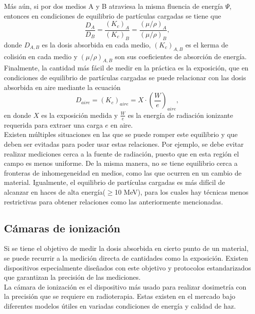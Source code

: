Más aún, si por dos medios A y B atraviesa la misma fluencia de energía $\Psi$, entonces en condiciones de equilibrio de partículas cargadas se tiene que 
\begin{equation}
	\frac{D_A}{D_B}=\frac{(K_c)_A}{(K_c)_B}=\frac{(\mu/\rho)_A}{(\mu/\rho)_B},
\end{equation}
donde $D_{A,B}$ es la dosis absorbida en cada medio, $(K_c)_{A,B}$ es el kerma de colisión en cada medio y $(\mu/\rho)_{A,B}$ son sus coeficientes de absorción de energía.\\

Finalmente, la cantidad más fácil de medir en la práctica es la exposición, que en condiciones de equilibrio de partículas cargadas se puede relacionar con las dosis absorbida en aire mediante la ecuación \cite{Attix1986}
\begin{equation}
\label{eqn:ExpoDosis}
	D_{aire}=(K_c)_{aire}=X\cdot \left(\frac{W}{e}\right)_{aire},
\end{equation}
en donde $X$ es la exposición medida y  $\frac{W}{e}$ es la energía de radiación ionizante requerida para extraer una carga $e$ en aire.\\

Existen múltiples situaciones en las que se puede romper este equilibrio y que deben ser evitadas para poder usar estas relaciones. Por ejemplo, se debe evitar realizar mediciones cerca a la fuente de radiación, puesto que en esta región el campo es menos uniforme. De la misma manera, no se tiene equilibrio cerca a fronteras de inhomegeneidad en medios, como las que ocurren en un cambio de material. Igualmente, el equilibrio de partículas cargadas es más difícil de alcanzar en haces de alta energía($\geq$10 MeV), para los cuales hay técnicas menos restrictivas para obtener relaciones como las anteriormente mencionadas\cite{Attix1986}.  
\subsection{Cámaras de ionización}
Si se tiene el objetivo de medir la dosis absorbida en cierto punto de un material, se puede recurrir a la medición directa de cantidades como la exposición. Existen dispositivos especialmente diseñados con este objetivo y protocolos estandarizados que garantizan la precisión de las mediciones. \\

La cámara de ionización es el dispositivo más usado para realizar dosimetría con la precisión que se requiere en radioterapia. Estas existen en el mercado bajo diferentes modelos útiles en variadas condiciones de energía y calidad de haz.\\


